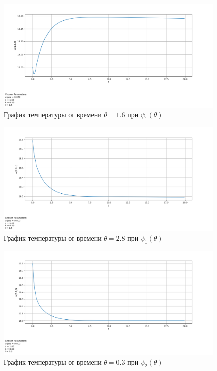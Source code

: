 {{\begin{figure}[H]
    \centering                             
	\includegraphics[width=\textwidth,height=\textheight,keepaspectratio]{kir/var_1_z_1t6.png}                 
	\caption{ График температуры от времени $\theta=1.6$ при $\psi_1(\theta)$}
	\label{grapics8}                           
\end{figure}                                  

\begin{figure}[H]
    \centering                             
	\includegraphics[width=\textwidth,height=\textheight,keepaspectratio]{kir/var_1_z_2t8.png}                 
	\caption{ График температуры от времени $\theta=2.8$ при $\psi_1(\theta)$}
	\label{grapics9}                           
\end{figure}              
\begin{figure}[H]
    \centering                             
	\includegraphics[width=\textwidth,height=\textheight,keepaspectratio]{pos/var_2_z_0t3.png}                 
	\caption{ График температуры от времени $\theta=0.3$ при $\psi_2(\theta)$}
	\label{grapics10}                           
\end{figure}               

}}
